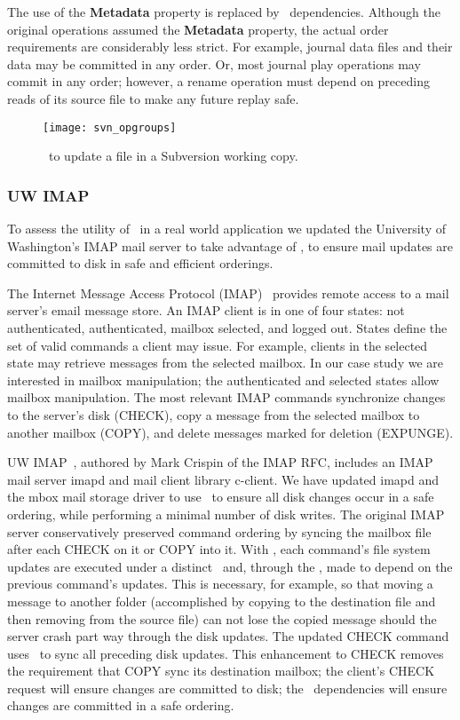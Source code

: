 The use of the \textbf{Metadata} property is replaced by \opgroup\
dependencies.
%
Although the original operations assumed the \textbf{Metadata}
property, the actual order requirements are considerably less strict.
%
For example, journal data files and their data may be committed in any
order.
%
Or, most journal play operations may commit in any order; however, a
rename operation must depend on preceding reads of its source file to
make any future replay safe.

\begin{figure}[htb]
  \centering
  \texttt{[image: svn\_opgroups]}
  \caption{\Opgroups\ to update a file in a Subversion working copy.}
  \label{fig:svn-order}
\end{figure}

\subsubsection{UW IMAP}
\label{sec:opgroup:uwimap}

To assess the utility of \opgroups\ in a real world application we
updated the University of Washington's IMAP mail server to take
advantage of \opgroups, to ensure mail updates are committed to disk
in safe and efficient orderings.

The Internet Message Access Protocol (IMAP)~\cite{rfc3501} provides
remote access to a mail server's email message store. An IMAP client
is in one of four states: not authenticated, authenticated, mailbox
selected, and logged out. States define the set of valid commands a
client may issue. For example, clients in the selected state may
retrieve messages from the selected mailbox. In our case study we are
interested in mailbox manipulation; the authenticated and selected
states allow mailbox manipulation. The most relevant IMAP commands
synchronize changes to the server's disk (CHECK), copy a message from
the selected mailbox to another mailbox (COPY), and delete messages
marked for deletion (EXPUNGE).

UW IMAP~\cite{uwimap}, authored by Mark Crispin of the IMAP RFC,
includes an IMAP mail server imapd and mail client library c-client.
We have updated imapd and the mbox mail storage driver to use
\opgroups\ to ensure all disk changes occur in a safe ordering, while
performing a minimal number of disk writes.
%
The original IMAP server conservatively preserved command ordering by
syncing the mailbox file after each CHECK on it or COPY into it. With
\opgroups, each command's file system updates are executed under a
distinct \opgroup\ and, through the \opgroup, made to depend on the
previous command's updates. This is necessary, for example, so that
moving a message to another folder (accomplished by copying to the
destination file and then removing from the source file) can not lose
the copied message should the server crash part way through the disk
updates.
%
The updated CHECK command uses \pgSync\ to sync all preceding disk
updates. This enhancement to CHECK removes the requirement that COPY
sync its destination mailbox; the client's CHECK request will ensure
changes are committed to disk; the \opgroup\ dependencies will ensure
changes are committed in a safe ordering.


